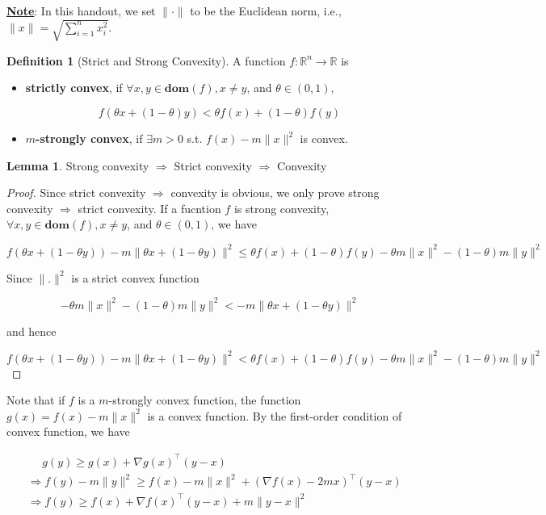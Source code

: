 \documentclass[12pt]{article} %
\theoremstyle{definition}
\newtheorem{lemma}{Lemma}
\newtheorem{definition}{Definition}
\newcommand{\Real}{\mathbb{R}}
\begin{document}
\noindent \color{red}\textbf{\underline{Note}}: In this handout, we set $\| \cdot \|$ to be the Euclidean norm, i.e., $\| x \| = \sqrt{\sum_{i = 1}^n x_i^2}$. \color{black} \\

\begin{definition}[Strict and Strong Convexity]
	A function $f:\Real^n \rightarrow \Real$ is 

	\begin{itemize}
		\item \textbf{strictly convex}, if $\forall x, y \in \mathbf{dom}(f),  x \ne y$, and $\theta \in (0, 1)$,

		$$
			f(\theta x + (1 - \theta) y) < \theta f(x) + (1 - \theta) f(y)
		$$

		\item   \textbf{$m$-strongly convex}, if $\exists m > 0$ s.t. $f(x) - m \|x\|^2$ is convex.
	\end{itemize}
\end{definition}

\begin{lemma}
	Strong convexity $\Rightarrow$ Strict convexity $\Rightarrow$ Convexity
\end{lemma}

\begin{proof}
	Since strict convexity $\Rightarrow$ convexity is obvious, we only prove strong convexity $\Rightarrow$ strict convexity. If a fucntion $f$ is strong convexity, $\forall x, y \in \mathbf{dom}(f),  x \ne y$, and $\theta \in (0, 1)$, we have

	$$
		f(\theta x + (1 - \theta y)) - m \| \theta x + (1 - \theta y)\|^2 \le \theta f(x) + (1 - \theta) f(y) - \theta m \|x\|^2 - (1 - \theta) m \| y \|^2
	$$

	Since $\| . \|^2$ is a strict convex function

	$$
		-  \theta m \|x\|^2 - (1 - \theta) m \| y \|^2 < -m \| \theta x + (1 - \theta y)\|^2
	$$

	and hence

	$$
		f(\theta x + (1 - \theta y)) - m \| \theta x + (1 - \theta y)\|^2 < \theta f(x) + (1 - \theta) f(y) - \theta m \|x\|^2 - (1 - \theta) m \| y \|^2
	$$
\end{proof}

Note that if $f$ is a $m$-strongly convex function, the function $g(x) = f(x) - m \| x \|^2$ is a convex function. By the first-order condition of convex function, we have

\begin{ceqn}
	\begin{align}
		&\, \, \quad g(y) \ge g(x) + \nabla g(x)^\intercal (y - x) \nonumber  \\
		&\Rightarrow f(y) - m \| y \|^2 \ge f(x) - m \| x \|^2 + (\nabla f(x) - 2 m x)^\intercal ( y - x) \nonumber \\
		&\Rightarrow f(y) \ge f(x) + \nabla f(x)^\intercal (y - x) + m \|y - x\|^2 
		\label{eq:strongly convex}
	\end{align}
\end{ceqn}
\end{document}
